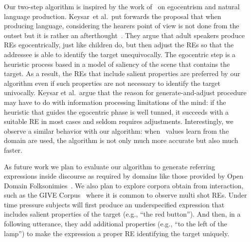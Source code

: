 Our two-step algorithm is inspired by the work of~\cite{keysar:Curr98} on egocentrism and natural language production. Keysar~et al.\ put forwards the proposal that when producing language, considering the hearers point of view is not done from the outset but it is rather an afterthought~\cite{keysar:Curr98}. They argue that adult speakers produce REs egocentrically, just like children do, but then adjust the REs so that the addressee is able to identify the target unequivocally. The egocentric step is a heuristic process based in a model of saliency of the scene that contains the target. As a result, the REs that include salient properties are preferred by our algorithm even if such properties are not necessary to identify the target univocally. Keysar et al.~argue that the reason for generate-and-adjust procedure may have to do with information processing limitations of the mind: if the heuristic that guides the egocentric phase is well tunned, it succeeds with a suitable RE in most cases and seldom requires adjustments. Interestingly, we observe a similar behavior with our algorithm: when \puse\ values learn from the domain are used, the algorithm is not only much more accurate but also much faster. 

As future work we plan to evaluate our algorithm to generate referring expressions inside discourse as required by domains like those provided by Open Domain Folksonimies~\cite{pacheco-duboue-dominguez:2012:NAACL-HLT}. We also plan to explore corpora obtain from interaction, such as the GIVE Corpus~\cite{GarGarKolStr10} where it is common to observe multi shot REs. Under time pressure subjects will first produce an underspecified expression that includes salient properties of the target (e.g., ``the red button'').  And then, in a following utterance, they add additional properties (e.g., ``to the left of the lamp'') to make the expression a proper RE  identifying the target uniquely.

